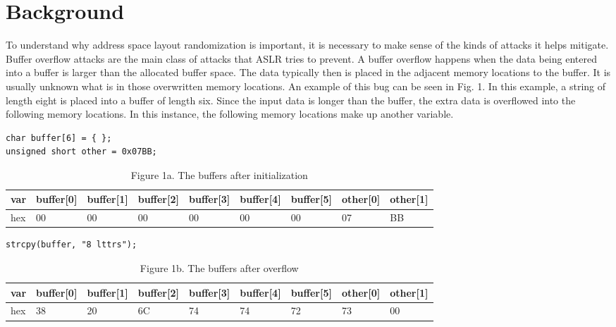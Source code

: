 \section{Background}
\label{s:background} %

To understand why address space layout randomization is important, it is necessary to make sense of the kinds of attacks it helps mitigate. Buffer overflow attacks are the main class of attacks that ASLR tries to prevent. A buffer overflow happens when the data being entered into a buffer is larger than the allocated buffer space. The data typically then is placed in the adjacent memory locations to the buffer. It is usually unknown what is in those overwritten memory locations. An example of this bug can be seen in Fig. 1. In this example, a string of length eight is placed into a buffer of length six. Since the input data is longer than the buffer, the extra data is overflowed into the following memory locations. In this instance, the following memory locations make up another variable.

\begin{lstlisting}[caption=Code before Figure 1a.]
char buffer[6] = { };
unsigned short other = 0x07BB;
\end{lstlisting}

\begin{table}[h]
\centering %
\begin{tabular}{|l|l|l|l|l|l|l|l|l|}
\hline
\multicolumn{1}{|c|}{var} & buffer{[}0{]} & buffer{[}1{]} & buffer{[}2{]} & buffer{[}3{]} & buffer{[}4{]} & buffer{[}5{]} & other{[}0{]} & other{[}1{]} \\ \hline
hex                       & 00            & 00            & 00            & 00            & 00            & 00            & 07           & BB           \\ \hline
\end{tabular}
\caption{Figure 1a. The buffers after initialization}
\label{t:fig1a}
\end{table}

\begin{lstlisting}[caption=Code before Figure 1b.]
strcpy(buffer, "8 lttrs");
\end{lstlisting}

\begin{table}[h]
\centering %
\begin{tabular}{|l|l|l|l|l|l|l|l|l|}
\hline
\multicolumn{1}{|c|}{var} & buffer{[}0{]} & buffer{[}1{]} & buffer{[}2{]} & buffer{[}3{]} & buffer{[}4{]} & buffer{[}5{]} & other{[}0{]} & other{[}1{]} \\ \hline
hex                       & 38            & 20            & 6C            & 74            & 74            & 72            & 73           & 00           \\ \hline
\end{tabular}
\caption{Figure 1b. The buffers after overflow}
\label{t:fig1b}
\end{table}

